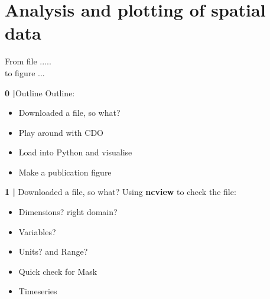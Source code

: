 
\section{Analysis and plotting of spatial data}

\begin{frame}
   \vspace{1.5cm}
   From file .....   \\
   \vspace{1.5cm}
   \hspace{5cm}  to figure ...  \\
\end{frame}

\begin{frame}{\textbf{0 |}Outline}
   Outline:
   \begin{itemize}
       \item Downloaded a file, so what?
            \vspace{0.3cm}
       \item Play around with CDO
            \vspace{0.3cm}
       \item Load into Python and visualise
            \vspace{0.3cm}
       \item Make a publication figure
   \end{itemize}
\end{frame}

\begin{frame}{\textbf{1 |} Downloaded a file, so what?}
Using \textbf{ncview} to check the file:
   \begin{itemize}
       \item Dimensions? right domain?
            \vspace{0.3cm}
       \item Variables?
            \vspace{0.3cm}
       \item Units? and Range?
            \vspace{0.3cm}
       \item Quick check for Mask
            \vspace{0.3cm}
       \item Timeseries
   \end{itemize}
\end{frame}


